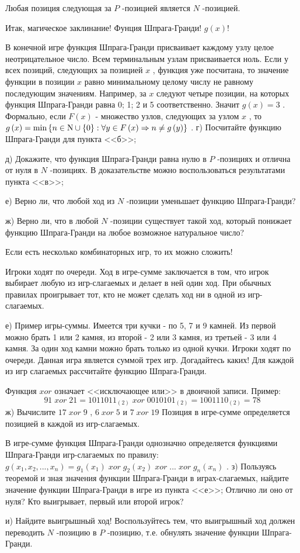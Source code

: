 {Любая позиция следующая за  $P$ -позицией является  $N$ -позицией.\par
Итак, магическое заклинание! Фунция Шпрага-Гранди!  $g\left(x\right)$!\par
В конечной игре функция Шпрага-Гранди присваивает каждому узлу целое неотрицательное число.
Всем терминальным узлам присваивается ноль.
Если у всех позиций, следующих за позицией  $x$ , функция уже посчитана, то значение функции в позиции  $x$  равно минимальному целому числу не равному последующим значениям.
Например, за  $x$  следуют четыре позиции, на которых функция Шпрага-Гранди равна 0; 1; 2 и 5 соответственно. Значит  $g\left(x\right)=3$ . Формально, если  $F\left(x\right)$  - множество узлов, следующих за узлом  $x$ , то  $g\left(x\right)=\min \left\{n\in {\rm N} \cup \left\{0\right\}:\forall y\in F\left(x\right)\Rightarrow n\ne g\left(y\right)\right\}$ .
г)	Посчитайте функцию Шпрага-Гранди для пункта <<б>>;\par
д)	Докажите, что функция Шпрага-Гранди равна нулю в  $P$ -позициях и отлична от нуля в  $N$ -позициях. В доказательстве можно воспользоваться результатами пункта <<в>>;\par
е)	Верно ли, что любой ход из  $N$ -позиции уменьшает функцию Шпрага-Гранди?\par
ж)	Верно ли, что в любой  $N$ -позиции существует такой ход, который понижает функцию Шпрага-Гранди на любое возможное натуральное число?\par
Если есть несколько комбинаторных игр, то их можно сложить! \par
Игроки ходят по очереди. Ход в игре-сумме заключается в том, что игрок выбирает любую из игр-слагаемых и делает в ней один ход. При обычных правилах проигрывает тот, кто не может сделать ход ни в одной из игр-слагаемых.\par
е)	Пример игры-суммы. Имеется три кучки - по 5, 7 и 9 камней. Из первой можно брать 1 или 2 камня, из второй - 2 или 3 камня, из третьей - 3 или 4 камня. За один ход камни можно брать только из одной кучки. Игроки ходят по очереди. Данная игра является суммой трех игр. Догадайтесь каких! Для каждой из игр слагаемых рассчитайте функцию Шпрага-Гранди.\par
Функция  $xor$  означает <<исключающее или>> в двоичной записи. Пример:  
$$91\; xor\; 21=1011011_{\left(2\right)} \; xor\; 0010101_{\left(2\right)} =1001110_{\left(2\right)} =78$$ 
ж)	Вычислите  $17\; xor\; 9$ ,  $6\; xor\; 5$  и  $7\; xor\; 19$ 
Позиция в игре-сумме определяется позицией в каждой из игр-слагаемых.\par
{}
В игре-сумме функция Шпрага-Гранди однозначно определяется функциями Шпрага-Гранди игр-слагаемых по правилу:  $g\left(x_{1} ,x_{2} ,...,x_{n} \right)=g_{1} \left(x_{1} \right)\; xor\; g_{2} \left(x_{2} \right)\; xor\; ...\; xor\; g_{n} \left(x_{n} \right)$ .
з)	Пользуясь теоремой и зная значения функции Шпрага-Гранди в играх-слагаемых, найдите значение функции Шпрага-Гранди в игре из пункта <<е>>; Отлично ли оно от нуля? Кто выигрывает, первый или второй игрок?\par
и)	Найдите выигрышный ход! Воспользуйтесь тем, что выигрышный ход должен переводить  $N$ -позицию в  $P$ -позицию, т.е. обнулять значение функции Шпрага-Гранди.} 
